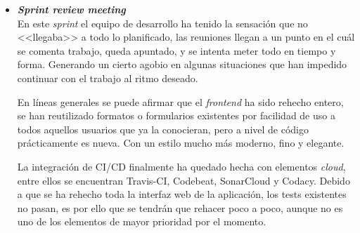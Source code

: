 \begin{itemize}
\item \textbf{\textit{Sprint review meeting}}\\
En este \textit{sprint} el equipo de desarrollo ha tenido la sensación que no <<llegaba>> a todo lo planificado, las reuniones llegan a un punto en el cuál se comenta trabajo, queda apuntado, y se intenta meter todo en tiempo y forma. Generando un cierto agobio en algunas situaciones que han impedido continuar con el trabajo al ritmo deseado.

En líneas generales se puede afirmar que el \textit{frontend} ha sido rehecho entero, se han reutilizado formatos o formularios existentes por facilidad de uso a todos aquellos usuarios que ya la conocieran, pero a nivel de código prácticamente es nueva. Con un estilo mucho más moderno, fino y elegante.

La integración de CI/CD finalmente ha quedado hecha con elementos \textit{cloud}, entre ellos se encuentran Travis-CI, Codebeat, SonarCloud y Codacy. Debido a que se ha rehecho toda la interfaz web de la aplicación, los tests existentes no pasan, es por ello que se tendrán que rehacer poco a poco, aunque no es uno de los elementos de mayor prioridad por el momento.

\end{itemize}

